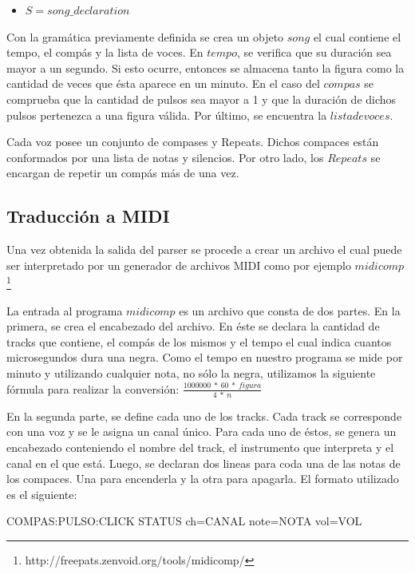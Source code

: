 \documentclass[a4paper, 10pt, twoside]{article}
\begin{document}
\begin{itemize}
\begin{equation*}
\begin{array}{l}
  \end{array}
  \right.
\end{equation*}
\item $S = song\_declaration$

\end{itemize}

Con la gramática previamente definida se crea un objeto $song$ el cual contiene el tempo, el compás y la lista de voces. En $tempo$, se verifica que su duración sea mayor a un segundo. Si esto ocurre, entonces se almacena tanto la figura como la cantidad de veces que ésta aparece en un minuto. En el caso del $compas$ se comprueba que la cantidad de pulsos sea mayor a 1 y que la duración de dichos pulsos pertenezca a una figura válida. Por último, se encuentra la $lista de voces$. 

Cada voz posee un conjunto de compases y Repeats. Dichos compaces están conformados por una lista de notas y silencios. Por otro lado, los $Repeats$ se encargan de repetir un compás más de una vez.

\subsection{Traducción a MIDI}
Una vez obtenida la salida del parser se procede a crear un archivo el cual puede ser interpretado por un generador de archivos MIDI como por ejemplo $midicomp$ \footnote{http://freepats.zenvoid.org/tools/midicomp/}

La entrada al programa $midicomp$ es un archivo que consta de dos partes. En la primera, se crea el encabezado del archivo. En éste se declara la cantidad de tracks que contiene, el compás de los mismos y el tempo el cual indica cuantos microsegundos dura una negra. Como el tempo en nuestro programa se mide por minuto y utilizando cualquier nota, no sólo la negra, utilizamos la siguiente fórmula para realizar la conversión:
$\frac{1000000\ *\ 60\ *\ figura}{4\ *\ n}$

En la segunda parte, se define cada uno de los tracks. Cada track se corresponde con una voz y se le asigna un canal único. Para cada uno de éstos, se genera un encabezado conteniendo el nombre del track, el instrumento que interpreta y el canal en el que está. Luego, se declaran dos lineas para coda una de las notas de los compaces. Una para encenderla y la otra para apagarla. El formato utilizado es el siguiente:

\begin{center} 
COMPAS:PULSO:CLICK STATUS ch=CANAL note=NOTA vol=VOL
\end{center}
\end{document}

